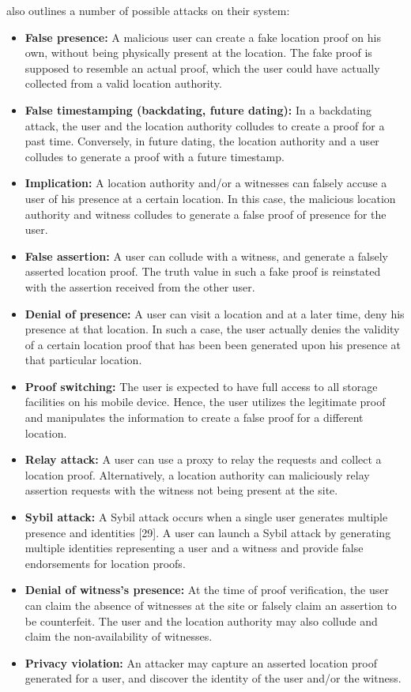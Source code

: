 \documentclass[12pt]{article}
\begin{document}
\cite{khan} also outlines a number of possible attacks on their system:
\begin{itemize}
	\item \textbf{False presence:} A malicious user can create a fake location proof on his own, without being physically present at the location. The fake proof is supposed to resemble an actual proof, which the user could have actually collected from a valid location authority.
	\item \textbf{False timestamping (backdating, future dating):} In a backdating attack, the user and the location authority colludes to create a proof for a past time. Conversely, in future dating, the location authority and a user colludes to generate a proof with a future timestamp.
	\item \textbf{Implication:} A location authority and/or a witnesses can falsely accuse a user of his presence at a certain location. In this case, the malicious location authority and witness colludes to generate a false proof of presence for the user.
	\item \textbf{False assertion:} A user can collude with a witness, and generate a falsely asserted location proof. The truth value in such a fake proof is reinstated with the assertion received from the other user.
	\item \textbf{Denial of presence:} A user can visit a location and at a later time, deny his presence at that location. In such a case, the user actually denies the validity of a certain location proof that has been been generated upon his presence at that particular location.
	\item \textbf{Proof switching:} The user is expected to have full access to all storage facilities on his mobile device. Hence, the user utilizes the legitimate proof and manipulates the information to create a false proof for a different location.
	\item \textbf{Relay attack:} A user can use a proxy to relay the requests and collect a location proof. Alternatively, a location authority can maliciously relay assertion requests with the witness not being present at the site.
	\item \textbf{Sybil attack:} A Sybil attack occurs when a single user generates multiple presence and identities [29]. A user can launch a Sybil attack by generating multiple identities representing a user and a witness and provide false endorsements for location proofs.
	\item \textbf{Denial of witness’s presence:} At the time of proof verification, the user can claim the absence of witnesses at the site or falsely claim an assertion to be counterfeit. The user and the location authority may also collude and claim the non-availability of witnesses.
	\item \textbf{Privacy violation:} An attacker may capture an asserted location proof generated for a user, and discover the identity of the user and/or the witness.
\end{itemize}
\end{document}
